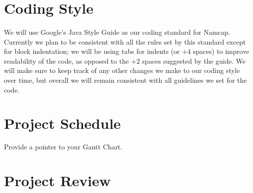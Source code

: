 \documentclass{article}
\begin{document}
\section{Coding Style}

\paragraph{}
We will use Google's Java Style Guide as our coding standard for Namcap. Currently we plan to be consistent with all the rules set by this standard except for block indentation; we will be using tabs for indents (or +4 spaces) to improve readability of the code, as opposed to the +2 spaces suggested by the guide. We will make sure to keep track of any other changes we make to our coding style over time, but overall we will remain consistent with all guidelines we set for the code.

\section{Project Schedule}

Provide a pointer to your Gantt Chart.

\section{Project Review}
\end{document}
